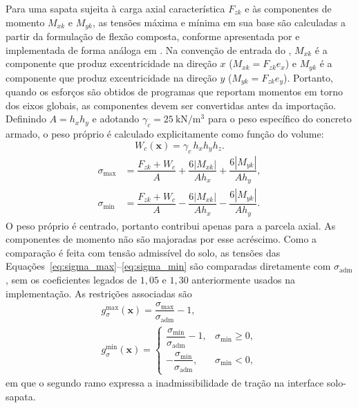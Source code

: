 Para uma sapata sujeita à carga axial característica $F_{zk}$ e às componentes de momento $M_{xk}$ e $M_{yk}$, as tensões máxima e mínima em sua base são calculadas a partir da formulação de flexão composta, conforme apresentada por  e implementada de forma análoga em . Na convenção de entrada do \fundaai{}, $M_{xk}$ é a componente que produz excentricidade na direção $x$ ($M_{xk}=F_{zk}e_x$) e $M_{yk}$ é a componente que produz excentricidade na direção $y$ ($M_{yk}=F_{zk}e_y$). Portanto, quando os esforços são obtidos de programas que reportam momentos em torno dos eixos globais, as componentes devem ser convertidas antes da importação. Definindo $A=h_xh_y$ e adotando $\gamma_c=\SI{25}{\kilo\newton\per\meter\cubed}$ para o peso específico do concreto armado, o peso próprio é calculado explicitamente como função do volume:
\begin{equation}
    W_c(\bm{x}) = \gamma_c \, h_x h_y h_z.
    \label{eq:peso_proprio}
\end{equation}
\begin{align}
    \sigma_{\max} &=
        \dfrac{F_{zk}+W_c}{A}
        + \dfrac{6 |M_{xk}|}{A h_x}
        + \dfrac{6 |M_{yk}|}{A h_y},
    \label{eq:sigma_max}\\
    \sigma_{\min} &=
        \dfrac{F_{zk}+W_c}{A}
        - \dfrac{6 |M_{xk}|}{A h_x}
        - \dfrac{6 |M_{yk}|}{A h_y}.
    \label{eq:sigma_min}
\end{align}
O peso próprio é centrado, portanto contribui apenas para a parcela axial. As componentes de momento não são majoradas por esse acréscimo. Como a comparação é feita com tensão admissível do solo, as tensões das Equações~\eqref{eq:sigma_max}--\eqref{eq:sigma_min} são comparadas diretamente com $\sigma_{\mathrm{adm}}$, sem os coeficientes legados de $1{,}05$ e $1{,}30$ anteriormente usados na implementação. As restrições associadas são
\begin{equation}
    \begin{gathered}
    g_{\sigma}^{\max}(\bm{x}) = \dfrac{\sigma_{\max}}{\sigma_{\mathrm{adm}}} - 1,
    \\[4pt]
    g_{\sigma}^{\min}(\bm{x}) =
    \begin{cases}
        \dfrac{\sigma_{\min}}{\sigma_{\mathrm{adm}}} - 1, & \sigma_{\min} \ge 0,\\[4pt]
        -\dfrac{\sigma_{\min}}{\sigma_{\mathrm{adm}}}, & \sigma_{\min} < 0,
    \end{cases}
    \end{gathered}
    \label{eq:g_tensao}
\end{equation}
em que o segundo ramo expressa a inadmissibilidade de tração na interface solo-sapata.

